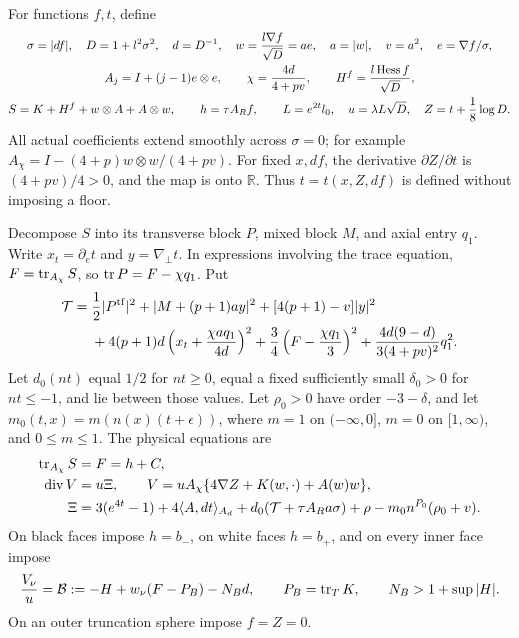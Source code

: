 For functions \(f,t\), define
\[
 \begin{gathered}
 \sigma=|df|,\quad D=1+l^2\sigma^2,\quad d=D^{-1},
 \quad w=\frac{l\nabla f}{\sqrt D}=ae,\quad
 a=|w|,\quad v=a^2,\quad e=\nabla f/\sigma,\\
 A_j=I+(j-1)e\otimes e,\qquad
 \chi=\frac{4d}{4+pv},\qquad
 H^f=\frac{l\operatorname{Hess} f}{\sqrt D},\\
 S=K+H^f+w\otimes A+A\otimes w,\qquad
 h=\tau A_Rf,\qquad
 L=e^{2t}l_0,\quad u=\lambda L\sqrt D,\quad
 Z=t+\frac18\log D .
 \end{gathered}
\]
All actual coefficients extend smoothly across \(\sigma=0\);
for example \(A_\chi=I-(4+p)w\otimes w/(4+pv)\).
For fixed \(x,df\), the derivative \(\partial Z/\partial t\) is
\((4+pv)/4>0\), and the map is onto \(\mathbb R\).
Thus \(t=t(x,Z,df)\) is defined without imposing a floor.

Decompose \(S\) into its transverse block \(P\), mixed block \(M\),
and axial entry \(q_1\).  Write \(x_t=\partial_et\) and
\(y=\nabla_\perp t\).  In expressions involving the trace equation,
\(F=\operatorname{tr}_{A_\chi}S\), so \(\operatorname{tr} P=F-\chi q_1\).  Put
\begin{equation}\label{eq:ah-T}
 \begin{split}
 \mathcal T={}&\frac12|P^{\rm tf}|^2
 +|M+(p+1)ay|^2+[4(p+1)-v]|y|^2\\
 &+4(p+1)d\left(x_t+\frac{\chi a q_1}{4d}\right)^2
 +\frac34\left(F-\frac{\chi q_1}{3}\right)^2
 +\frac{4d(9-d)}{3(4+pv)^2}q_1^2 .
 \end{split}
\end{equation}
Let \(d_0(nt)\) equal \(1/2\) for \(nt\ge0\), equal a fixed
sufficiently small \(\delta_0>0\) for \(nt\le-1\), and lie between
those values.  Let \(\rho_0>0\) have order \(-3-\delta\), and let
\(m_0(t,x)=m(n(x)(t+\epsilon))\), where \(m=1\) on
\((-\infty,0]\), \(m=0\) on \([1,\infty)\), and \(0\le m\le1\).
The physical equations are
\begin{equation}\label{eq:ah-system}
 \begin{split}
 \operatorname{tr}_{A_\chi}S&=F=h+C,\\
 \operatorname{div}V&=u\Xi,\qquad
 V=uA_\chi\{4\nabla Z+K(w,\cdot)+A(w)w\},\\
 \Xi&=3(e^{4t}-1)+4\langle A,dt\rangle_{A_d}
 +d_0(\mathcal T+\tau A_Ra\sigma)+\rho
 -m_0n^{P_0}(\rho_0+v).
 \end{split}
\end{equation}
On black faces impose \(h=b_-\), on white faces \(h=b_+\), and
on every inner face impose
\begin{equation}\label{eq:ah-inner-flux}
 \frac{V_\nu}{u}
 =\mathcal B:=-H+w_\nu(F-P_B)-N_Bd,\qquad
 P_B=\operatorname{tr}_TK,\qquad N_B>1+\sup|H|.
\end{equation}
On an outer truncation sphere impose \(f=Z=0\).

